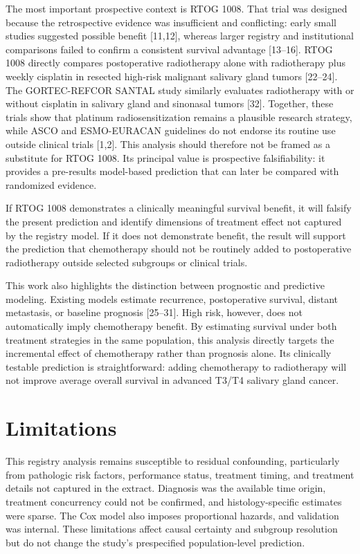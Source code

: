 \documentclass[10pt,twocolumn]{article}
\begin{document}
The most important prospective context is RTOG 1008. That trial was designed because the retrospective evidence was insufficient and conflicting: early small studies suggested possible benefit [11,12], whereas larger registry and institutional comparisons failed to confirm a consistent survival advantage [13--16]. RTOG 1008 directly compares postoperative radiotherapy alone with radiotherapy plus weekly cisplatin in resected high-risk malignant salivary gland tumors [22--24]. The GORTEC-REFCOR SANTAL study similarly evaluates radiotherapy with or without cisplatin in salivary gland and sinonasal tumors [32]. Together, these trials show that platinum radiosensitization remains a plausible research strategy, while ASCO and ESMO-EURACAN guidelines do not endorse its routine use outside clinical trials [1,2]. This analysis should therefore not be framed as a substitute for RTOG 1008. Its principal value is prospective falsifiability: it provides a pre-results model-based prediction that can later be compared with randomized evidence.\par
If RTOG 1008 demonstrates a clinically meaningful survival benefit, it will falsify the present prediction and identify dimensions of treatment effect not captured by the registry model. If it does not demonstrate benefit, the result will support the prediction that chemotherapy should not be routinely added to postoperative radiotherapy outside selected subgroups or clinical trials.\par
This work also highlights the distinction between prognostic and predictive modeling. Existing models estimate recurrence, postoperative survival, distant metastasis, or baseline prognosis [25--31]. High risk, however, does not automatically imply chemotherapy benefit. By estimating survival under both treatment strategies in the same population, this analysis directly targets the incremental effect of chemotherapy rather than prognosis alone. Its clinically testable prediction is straightforward: adding chemotherapy to radiotherapy will not improve average overall survival in advanced T3/T4 salivary gland cancer.\par
\section{Limitations}
This registry analysis remains susceptible to residual confounding, particularly from pathologic risk factors, performance status, treatment timing, and treatment details not captured in the extract. Diagnosis was the available time origin, treatment concurrency could not be confirmed, and histology-specific estimates were sparse. The Cox model also imposes proportional hazards, and validation was internal. These limitations affect causal certainty and subgroup resolution but do not change the study's prespecified population-level prediction.\par
\end{document}
